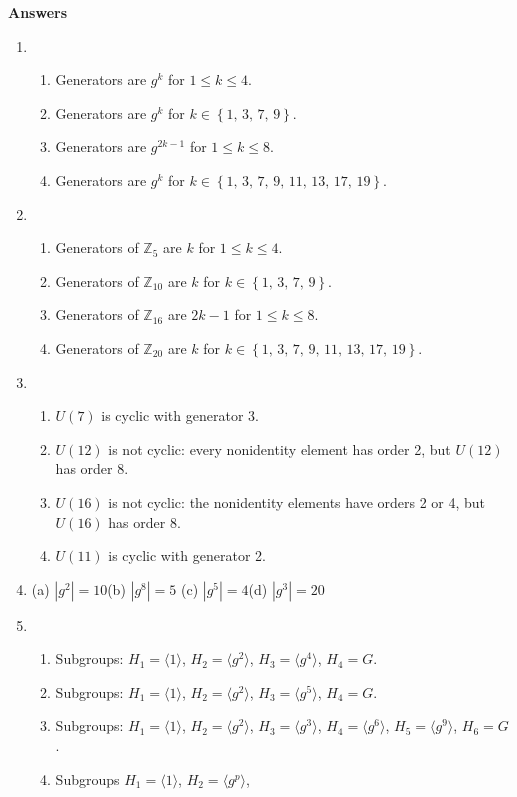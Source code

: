 \documentclass[11pt]{article}
\newcommand{\order}[1]{\ensuremath{|#1|}}
\newcommand{\units}[1]{\ensuremath{U(#1)}}
\newcommand{\<}{\ensuremath{\langle}}
\renewcommand{\>}{\ensuremath{\rangle}}
\newcommand{\Z} {{\mathbb Z}}
\newcommand{\set}[1]{\left\{#1\right\}}
\theoremstyle{plain}
\theoremstyle{definition}
\begin{document}
\centerline{\bf Answers}
\begin{enumerate}
\item \begin{enumerate}
\item Generators are $g^k$ for $1\le k\le 4$.
\item Generators are $g^k$ for $k\in\set{1,\,3,\,7,\,9}$.
\item Generators are $g^{2k-1}$ for $1\le k\le 8$.
\item Generators are $g^k$ for $k\in\set{1,\,3,\,7,\,9,\,11,\,13,\,17,\,19}$.
\end{enumerate}
\item \begin{enumerate}
\item Generators of $\Z_5$ are $k$ for $1\le k\le 4$.
\item Generators of $\Z_{10}$ are $k$ for $k\in\set{1,\,3,\,7,\,9}$.
\item Generators of $\Z_{16}$ are $2k-1$ for $1\le k\le 8$.
\item Generators of $\Z_{20}$ are $k$ for $k\in\set{1,\,3,\,7,\,9,\,11,\,13,\,17,\,19}$.
\end{enumerate}
\item \begin{enumerate}
\item $\units{7}$ is cyclic with generator 3.
\item $\units{12}$ is not cyclic: every nonidentity element has order 2, but
$\units{12}$ has order 8.
\item $\units{16}$ is not cyclic: the nonidentity elements have orders 2 or 4, but $\units{16}$ has order 8.
\item $\units{11}$ is cyclic with generator 2.
\end{enumerate}
\item
(a) $\order{g^2}=10$\qquad (b) $\order{g^8}=5$ \qquad (c) $\order{g^5}=4$\qquad (d)
$\order{g^3}=20$
\item \begin{enumerate}
\item Subgroups:  $H_1=\langle 1\rangle$, $H_2=\langle g^2\rangle$,
$H_3=\langle g^4\rangle$, $H_4=G$.
\item Subgroups: $H_1=\langle 1\rangle$, $H_2=\langle g^2\rangle$,
$H_3=\langle g^5\rangle$, $H_4=G$.
\item Subgroups: $H_1=\langle 1\rangle$, $H_2=\langle g^2\rangle$,
$H_3=\langle g^3\rangle$, $H_4=\langle g^6\rangle$, 
$H_5=\langle g^9\rangle $, $H_6=G$.
\item Subgroups $H_1=\langle 1\rangle$, $H_2=\langle g^p\rangle$,

\end{enumerate}
\end{enumerate}
\end{document}
